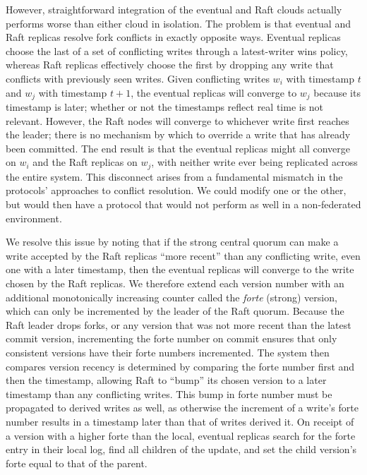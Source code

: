 \documentclass[10pt,conference,letterpaper]{IEEEtran}
\begin{document}
However, straightforward integration of the eventual and Raft clouds actually performs worse
than either cloud in isolation.
The problem is that eventual and Raft replicas resolve fork conflicts in exactly opposite
ways.
Eventual replicas choose the last of a set of conflicting writes through a latest-writer
wins policy, whereas Raft replicas effectively choose the first by dropping any write that
conflicts with previously seen writes.
Given conflicting writes $w_i$ with timestamp $t$ and $w_j$ with timestamp $t+1$, the
eventual replicas will converge to $w_j$ because its timestamp is later; whether or not
the timestamps reflect real time is not relevant.
However, the Raft nodes will converge to whichever write first reaches the leader; there
is no mechanism by which to override a write that has already been committed.
The end result is that the eventual replicas might all converge on $w_i$ and the Raft
replicas on $w_j$, with neither write ever being replicated across the entire system.
This disconnect arises from a fundamental mismatch in the protocols' approaches to
conflict resolution.
We could modify one or the other, but would then have a protocol that would not perform as
well in a non-federated environment.

We resolve this issue by noting that if the strong central quorum can make a write
accepted by the Raft replicas ``more recent'' than any conflicting write, even one with a
later timestamp, then the eventual replicas will converge to the write chosen by the Raft
replicas.
We therefore extend each version number with an additional monotonically increasing
counter called the \textit{forte} (strong) version, which can only be incremented by the
leader of the Raft quorum.
Because the Raft leader drops forks, or any version that was not more recent than the
latest commit version, incrementing the forte number on commit ensures that only
consistent versions have their forte numbers incremented.
The system then compares version recency is determined by comparing the forte number first
and then the timestamp, allowing Raft to ``bump'' its chosen version to a later timestamp
than any conflicting writes.
This bump in forte number must be propagated to derived writes as well, as otherwise the
increment of a write's forte number results in a timestamp later than that of writes
derived it.
On receipt of a version with a higher forte
than the local, eventual replicas search for the forte entry in their local log, find
all children of the update, and set the child version's forte equal to that of the parent.
\end{document}
